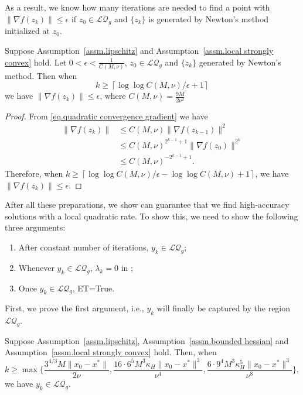 \documentclass{mcom-l}
\numberwithin{equation}{section}
\begin{document}
As a result, we know how many iterations are needed to find a point with $\|\nabla f(z_k)\|\leq \epsilon$ if $z_0 \in \mathcal{LQ}_g$ and $\{z_k\}$ is generated by Newton's method initialized at $z_0$.
\begin{corollary}
    \label{lem.number of iterations newton}
    Suppose Assumption~\ref{assm.lipschitz} and Assumption~\ref{assm.local strongly convex} hold. Let $0<\epsilon< \frac{1}{C(M,\nu)}$, $z_0\in\mathcal{LQ}_g$ and $\{z_k\}$ generated by Newton's method. Then when
    \begin{equation}
        \label{eq.number of iterations newton}
        k\geq \left\lceil\log\log C(M,\nu)/\epsilon+1\right\rceil
    \end{equation}
    we have $\|\nabla f(z_k)\|\leq \epsilon$, where $C(M,\nu) = \frac{9M}{2\nu^2}$
\end{corollary}
\begin{proof}
    From \eqref{eq.quadratic convergence gradient} we have
    \begin{equation*}
        \begin{aligned}
            \|\nabla f(z_k)\| & \leq C(M,\nu)\|\nabla f(z_{k-1})\|^2              \\
                              & \leq C(M,\nu)^{2^{k-1}+1} \|\nabla f(z_0)\|^{2^k} \\
                              & \leq C(M,\nu)^{-2^{k-1}+1}.
        \end{aligned}
    \end{equation*}
    Therefore, when $k\geq \left\lceil\log\log C(M,\nu)/\epsilon-\log\log C(M,\nu)+1\right\rceil$, we have $\|\nabla f(z_k)\|\leq \epsilon$.
\end{proof}
After all these preparations, we show  can guarantee that we find high-accuracy solutions with a local quadratic rate. To show this, we need to show the following three arguments:
\begin{enumerate}
    \item After constant number of iterations, $y_k\in\mathcal{LQ}_g$;
    \item Whenever $y_k\in\mathcal{LQ}_g$, $\lambda_k=0$ in ;
    \item Once $y_k\in \mathcal{LQ}_g$, ET=True.
\end{enumerate}
First, we prove the first argument, i.e., $y_k$ will finally be captured by the region $\mathcal{LQ}_g$.
\begin{lemma}
    Suppose Assumption~\ref{assm.lipschitz}, Assumption~\ref{assm.bounded hessian} and Assumption~\ref{assm.local strongly convex} hold. Then, when
    \begin{equation*}
        k\geq \max\{\frac{3^{4/3}M\|x_0-x^*\|}{2\nu},\frac{16\cdot6^5 M^3\kappa_H\|x_0-x^*\|^3}{\nu^4},\frac{6\cdot9^4 M^3\kappa_H^5\|x_0-x^*\|^3}{\nu^8}\},
    \end{equation*}
    we have $y_k\in \mathcal{LQ}_g$.
\end{lemma}
\end{document}
